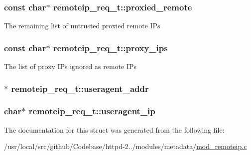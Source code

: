 \subsubsection[{\texorpdfstring{proxied\+\_\+remote}{proxied_remote}}]{\setlength{\rightskip}{0pt plus 5cm}const char$\ast$ remoteip\+\_\+req\+\_\+t\+::proxied\+\_\+remote}\hypertarget{structremoteip__req__t_a243ef3651318153186aa23dd10b5dddd}{}\label{structremoteip__req__t_a243ef3651318153186aa23dd10b5dddd}
The remaining list of untrusted proxied remote IP\textquotesingle{}s 
\subsubsection[{\texorpdfstring{proxy\+\_\+ips}{proxy_ips}}]{\setlength{\rightskip}{0pt plus 5cm}const char$\ast$ remoteip\+\_\+req\+\_\+t\+::proxy\+\_\+ips}\hypertarget{structremoteip__req__t_a270ca4ec962a690ff8f1b9c095981f97}{}\label{structremoteip__req__t_a270ca4ec962a690ff8f1b9c095981f97}
The list of proxy IP\textquotesingle{}s ignored as remote IP\textquotesingle{}s 
\subsubsection[{\texorpdfstring{useragent\+\_\+addr}{useragent_addr}}]{$\ast$ remoteip\+\_\+req\+\_\+t\+::useragent\+\_\+addr}\hypertarget{structremoteip__req__t_a2e8ff0497898f3a8745cafc9e5f34035}{}\label{structremoteip__req__t_a2e8ff0497898f3a8745cafc9e5f34035}
\subsubsection[{\texorpdfstring{useragent\+\_\+ip}{useragent_ip}}]{\setlength{\rightskip}{0pt plus 5cm}char$\ast$ remoteip\+\_\+req\+\_\+t\+::useragent\+\_\+ip}\hypertarget{structremoteip__req__t_a162b7158e75401e95e5d40df54cf8032}{}\label{structremoteip__req__t_a162b7158e75401e95e5d40df54cf8032}


The documentation for this struct was generated from the following file\+:\begin{DoxyCompactItemize}
\item 
/usr/local/src/github/\+Codebase/httpd-\/2../modules/metadata/\hyperlink{mod__remoteip_8c}{mod\+\_\+remoteip.\+c}\end{DoxyCompactItemize}
